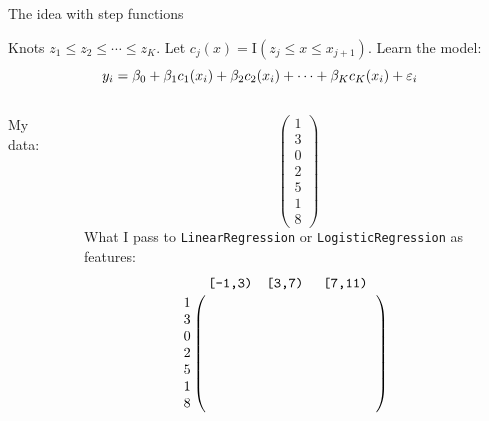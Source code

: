 \documentclass[aspectratio=169,usenames,dvipsnames]{beamer}
\begin{document}
\begin{frame}[c]{The idea with step functions }

	Knots $z_1 \leq z_2 \leq \cdots \leq z_K$. Let $c_j(x) = \mathrm{I}(z_j \leq x \leq x_{j+1})$.
	Learn the model:
	\begin{equation*}
		y_i = \beta_0 + \beta_1 c_1(x_i) + \beta_2 c_2(x_i) + \cdots + \beta_K c_K(x_i) + \varepsilon_i
	\end{equation*}

	\begin{columns}
	\centering
	My data:

	\begin{equation*}
		\begin{pmatrix}
			1 \\
			3 \\
			0 \\
			2 \\
			5 \\
			1 \\
			8
		\end{pmatrix}
	\end{equation*}
	\centering
	What I pass to \texttt{LinearRegression} or \texttt{LogisticRegression} as features:
	\begin{equation*}
			\bordermatrix{ & \texttt{[-1,3)} & \texttt{[3,7)} & \texttt{[7,11)} \cr
				1 &\qquad  & \qquad  & \qquad \qquad\cr
				3 &\qquad   &  &  \cr
				0 &\qquad  &  &  \cr
				2 &\qquad   &  &  \cr
				5 &\qquad   &  &  \cr
				1 &\qquad   &  &  \cr
				8 &\qquad   &  &  \cr
				 } \qquad
	\end{equation*}

	\end{columns}
\end{frame}
\end{document}
